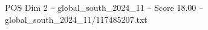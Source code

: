 \begin{textsample}{POS Dim 2 – global\_south\_2024\_11 – Score 18.00 – global\_south\_2024\_11/117485207.txt}
\end{textsample}
